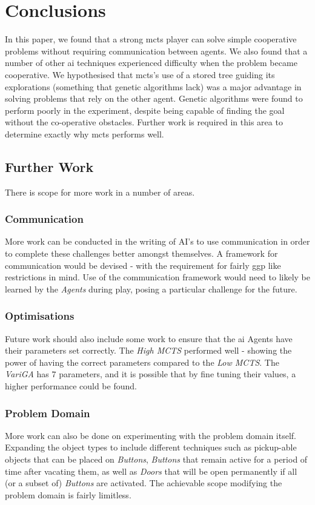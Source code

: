 \documentclass{IEEEtran}
\begin{document}
\section{Conclusions}
In this paper, we found that a strong \gls{mcts} player can solve simple cooperative problems without requiring communication between agents. We also found that a number of other \gls{ai} techniques experienced difficulty when the problem became cooperative. We hypothesised that \gls{mcts}'s use of a stored tree guiding its explorations (something that genetic algorithms lack) was a major advantage in solving problems that rely on the other agent. Genetic algorithms were found to perform poorly in the experiment, despite being capable of finding the goal without the co-operative obstacles. Further work is required in this area to determine exactly why \gls{mcts} performs well.

\subsection{Further Work}
There is scope for more work in a number of areas.

\subsubsection{Communication}
More work can be conducted in the writing of AI's to use communication in order to complete these challenges better amongst themselves. A framework for communication would be devised - with the requirement for fairly \gls{ggp} like restrictions in mind. Use of the communication framework would need to likely be learned by the \emph{Agents} during play, posing a particular challenge for the future.

\subsubsection{Optimisations}
Future work should also include some work to ensure that the \gls{ai} Agents have their parameters set correctly. The \emph{High MCTS} performed well - showing the power of having the correct parameters compared to the \emph{Low MCTS}. The \emph{VariGA} has $7$ parameters, and it is possible that by fine tuning their values, a higher performance could be found.

\subsubsection{Problem Domain}
More work can also be done on experimenting with the problem domain itself. Expanding the object types to include different techniques such as pickup-able objects that can be placed on \emph{Buttons}, \emph{Buttons} that remain active for a period of time after vacating them, as well as \emph{Doors} that will be open permanently if all (or a subset of) \emph{Buttons} are activated. The achievable scope modifying the problem domain is fairly limitless.



\end{document}
